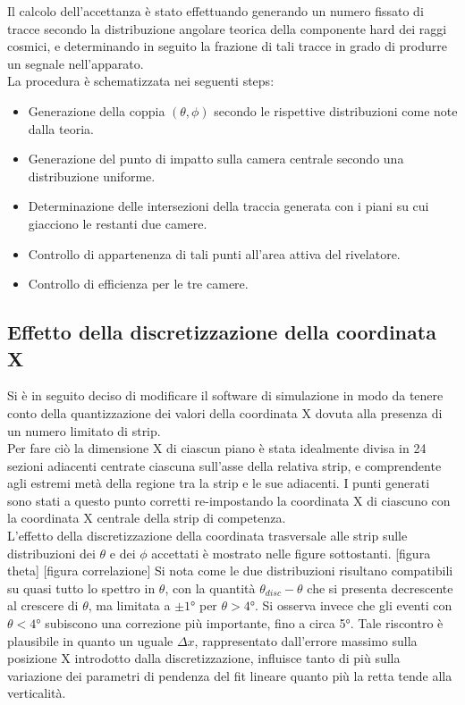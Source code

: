 \documentclass[8pt]{extarticle}
\begin{document}
Il calcolo dell'accettanza è stato effettuando generando un numero fissato di tracce secondo la distribuzione angolare teorica della componente hard dei raggi cosmici, e determinando in seguito la frazione di tali tracce in grado di produrre un segnale nell'apparato.\\
La procedura è schematizzata nei seguenti steps:
\begin{itemize}
\item Generazione della coppia $(\theta, \phi)$ secondo le rispettive distribuzioni come note dalla teoria.
\item Generazione del punto di impatto sulla camera centrale secondo una distribuzione uniforme.
\item Determinazione delle intersezioni della traccia generata con i piani su cui giacciono le restanti due camere.
\item Controllo di appartenenza di tali punti all'area attiva del rivelatore.
\item Controllo di efficienza per le tre camere.
\end{itemize}



\subsection{Effetto della discretizzazione della coordinata X}
Si è in seguito deciso di modificare il software di simulazione in modo da tenere conto della quantizzazione dei valori della coordinata X dovuta alla presenza di un numero limitato di strip.\\
Per fare ciò la dimensione X di ciascun piano è stata idealmente divisa in 24 sezioni adiacenti centrate ciascuna sull'asse della relativa strip, e comprendente agli estremi metà della regione tra la strip e le sue adiacenti. I punti generati sono stati a questo punto corretti re-impostando la coordinata X di ciascuno con la coordinata X centrale della strip di competenza. \\
L'effetto della discretizzazione della coordinata trasversale alle strip sulle distribuzioni dei $\theta$ e dei $\phi$ accettati è mostrato nelle figure sottostanti.
[figura theta]
[figura correlazione]
Si nota come le due distribuzioni risultano compatibili su quasi tutto lo spettro in $\theta$, con la quantità $\theta_{disc}-\theta$ che si presenta decrescente al crescere di $\theta$, ma limitata a $\pm 1°$ per $\theta>4°$. Si osserva invece che gli eventi con $\theta < 4°$ subiscono una correzione più importante, fino a circa 5°. Tale riscontro è plausibile in quanto un uguale $\Delta x$, rappresentato dall'errore massimo sulla posizione X introdotto dalla discretizzazione, influisce tanto di più sulla variazione dei parametri di pendenza del fit lineare quanto più la retta tende alla verticalità.\\
\end{document}
